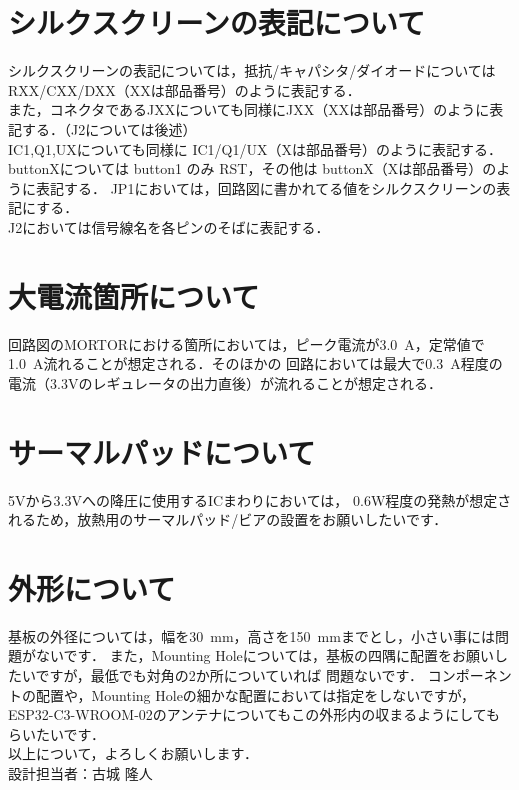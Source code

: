\documentclass[a4paper,11pt]{ltjsarticle}
\begin{document}
\section{シルクスクリーンの表記について}
シルクスクリーンの表記については，抵抗/キャパシタ/ダイオードについては
RXX/CXX/DXX（XXは部品番号）のように表記する．\\
また，コネクタであるJXXについても同様にJXX（XXは部品番号）のように表記する．（J2については後述）\\
IC1,Q1,UXについても同様に IC1/Q1/UX（Xは部品番号）のように表記する．\\
buttonXについては button1 のみ RST，その他は buttonX（Xは部品番号）のように表記する．
JP1においては，回路図に書かれてる値をシルクスクリーンの表記にする．\\
J2においては信号線名を各ピンのそばに表記する．\\
\section{大電流箇所について}
回路図のMORTORにおける箇所においては，ピーク電流が\qty{3.0}{A}，定常値で\qty{1.0}{A}流れることが想定される．そのほかの
回路においては最大で\qty{0.3}{A}程度の電流（3.3Vのレギュレータの出力直後）が流れることが想定される．
\section{サーマルパッドについて}
5Vから3.3Vへの降圧に使用するICまわりにおいては，
0.6W程度の発熱が想定されるため，放熱用のサーマルパッド/ビアの設置をお願いしたいです．
\section{外形について}
基板の外径については，幅を\qty{30}{mm}，高さを\qty{150}{mm}までとし，小さい事には問題がないです．
また，Mounting Holeについては，基板の四隅に配置をお願いしたいですが，最低でも対角の2か所についていれば
問題ないです．
コンポーネントの配置や，Mounting Holeの細かな配置においては指定をしないですが，ESP32-C3-WROOM-02のアンテナについてもこの外形内の収まるようにしてもらいたいです．\\
以上について，よろしくお願いします．\\
設計担当者：古城 隆人
\end{document}
